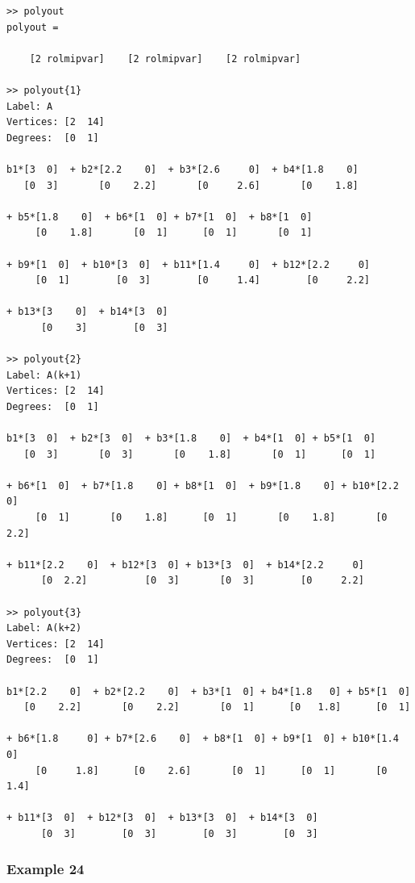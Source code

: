 \documentclass[english,11pt]{article}
\theoremstyle{break} \theorembodyfont{\small\rm}
\begin{document}
\begin{minipage}{17.2cm}
\begin{lstlisting}[rulecolor=\color{red}]
>> polyout
polyout = 

    [2 rolmipvar]    [2 rolmipvar]    [2 rolmipvar]
    
>> polyout{1}
Label: A
Vertices: [2  14]
Degrees:  [0  1]
 
b1*[3  0]  + b2*[2.2    0]  + b3*[2.6     0]  + b4*[1.8    0]
   [0  3]       [0    2.2]       [0     2.6]       [0    1.8]

+ b5*[1.8    0]  + b6*[1  0] + b7*[1  0]  + b8*[1  0]  
     [0    1.8]       [0  1]      [0  1]       [0  1] 
    
+ b9*[1  0]  + b10*[3  0]  + b11*[1.4     0]  + b12*[2.2     0]
     [0  1]        [0  3]        [0     1.4]        [0     2.2]

+ b13*[3    0]  + b14*[3  0]               
      [0    3]        [0  3]                          
     
>> polyout{2}
Label: A(k+1)
Vertices: [2  14]
Degrees:  [0  1]
 
b1*[3  0]  + b2*[3  0]  + b3*[1.8    0]  + b4*[1  0] + b5*[1  0] 
   [0  3]       [0  3]       [0    1.8]       [0  1]      [0  1]
   
+ b6*[1  0]  + b7*[1.8    0] + b8*[1  0]  + b9*[1.8    0] + b10*[2.2    0]
     [0  1]       [0    1.8]      [0  1]       [0    1.8]       [0    2.2]  
   
+ b11*[2.2    0]  + b12*[3  0] + b13*[3  0]  + b14*[2.2     0] 
      [0  2.2]          [0  3]       [0  3]        [0     2.2]                          
   
>> polyout{3}
Label: A(k+2)
Vertices: [2  14]
Degrees:  [0  1]
 
b1*[2.2    0]  + b2*[2.2    0]  + b3*[1  0] + b4*[1.8   0] + b5*[1  0]
   [0    2.2]       [0    2.2]       [0  1]      [0   1.8]      [0  1]
   
+ b6*[1.8     0] + b7*[2.6    0]  + b8*[1  0] + b9*[1  0] + b10*[1.4    0] 
     [0     1.8]      [0    2.6]       [0  1]      [0  1]       [0    1.4]     
   
+ b11*[3  0]  + b12*[3  0]  + b13*[3  0]  + b14*[3  0]          
      [0  3]        [0  3]        [0  3]        [0  3]          
\end{lstlisting}
\end{minipage}
\vspace{0.2cm}



\subsubsection*{Example 24}
\end{document}
